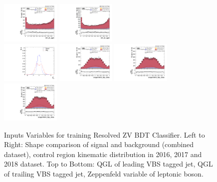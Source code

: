 \begin{figure}[!ht]
  \includegraphics[width=0.25\textwidth]{analysis_plots/2017_zjj/cr_vjets_l/vbf_j2_qgid.pdf} \hspace{-10pt}
  \includegraphics[width=0.25\textwidth]{analysis_plots/2018_zjj/cr_vjets_l/vbf_j2_qgid.pdf} \hspace{-10pt}  \\
  \includegraphics[width=0.25\textwidth]{analysis_plots/tmva_plots/zjj_BDTG14_zeppLep_deta.pdf} \hspace{-10pt}
  \includegraphics[width=0.25\textwidth]{analysis_plots/2016_zjj/cr_vjets_l/zeppenfeld_lep_deta.pdf} \hspace{-10pt}
  \includegraphics[width=0.25\textwidth]{analysis_plots/2017_zjj/cr_vjets_l/zeppenfeld_lep_deta.pdf} \hspace{-10pt}
  \includegraphics[width=0.25\textwidth]{analysis_plots/2018_zjj/cr_vjets_l/zeppenfeld_lep_deta.pdf} \hspace{-10pt}
  \caption[Inputs Variables for training Resolved ZV BDT Classifier]%
  {Inputs Variables for training Resolved ZV BDT Classifier.
    Left to Right: Shape comparison of signal and background (combined dataset), control region
    kinematic distribution in 2016, 2017 and 2018 dataset.
    Top to Bottom: QGL of leading VBS tagged jet,
    QGL of trailing VBS tagged jet, Zeppenfeld variable of leptonic boson.}%
  \label{fig:vbs-training-input-zjj-1}
\end{figure}

